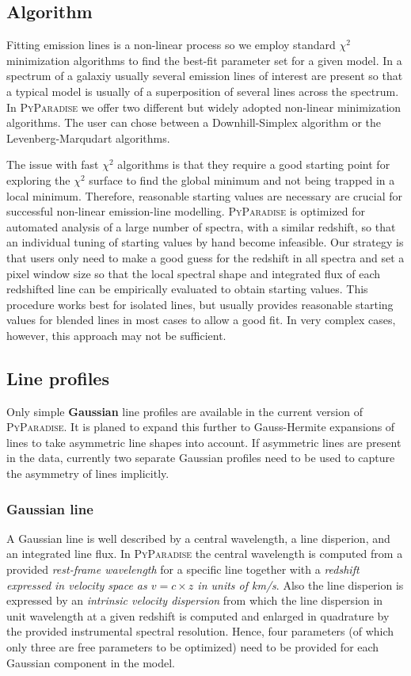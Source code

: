 \documentclass[usenatbib,usegraphicx,useAMS,onecolumn]{mn2e}
\begin{document}
\subsection{Algorithm}\label{subsec:em_algo}
Fitting emission lines is a non-linear process so we employ standard $\chi^2$ minimization algorithms to find the best-fit parameter set for a given model. In a spectrum of a galaxiy usually several emission lines of interest are present so that a typical model is usually of a superposition of several lines across the spectrum. In \textsc{PyParadise} we offer two different but widely adopted non-linear minimization algorithms. The user can chose between a Downhill-Simplex algorithm or the Levenberg-Marqudart algorithms. 

The issue with fast $\chi^2$ algorithms is that they require a good starting point for exploring the $\chi^2$ surface to find the global minimum and not being trapped in a local minimum. Therefore, reasonable starting values are necessary are crucial for successful non-linear emission-line modelling. \textsc{PyParadise} is optimized for automated analysis of a large number of spectra, with a similar redshift, so that an individual tuning of starting values by hand become infeasible. Our strategy is that users only need to make a good guess for the redshift in all spectra and set a pixel window size so that the local spectral shape and integrated flux of each redshifted line can be empirically evaluated to obtain starting values. This procedure works best for isolated lines, but usually provides reasonable starting values for blended lines in most cases to allow a good fit. In very complex cases, however, this approach may not be sufficient.

\subsection{Line profiles}\label{subsec:em_profile}
Only simple \textbf{Gaussian} line profiles are available in the current version of \textsc{PyParadise}. It is planed to expand this further to Gauss-Hermite expansions of lines to take asymmetric line shapes into account. If asymmetric lines are present in the data, currently two separate Gaussian profiles need to be used to capture the asymmetry of lines implicitly.
\subsubsection{Gaussian line}
A Gaussian line is well described by a central wavelength, a line disperion, and an integrated line flux.  In \textsc{PyParadise} the central wavelength is computed from a provided \textit{rest-frame wavelength} for a specific line together with a \textit{redshift expressed in velocity space as $v= c\times z$ in units of km/s}. Also the line disperion is expressed by an \textit{intrinsic velocity dispersion} from which the line dispersion in unit wavelength at a given redshift is computed and enlarged in quadrature by the provided instrumental spectral resolution. Hence, four parameters (of which only three are free parameters to be optimized) need to be provided for each Gaussian component in the model.
\end{document}
